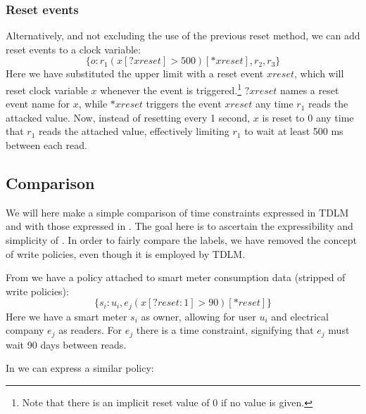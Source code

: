 \subsubsection{Reset events}
Alternatively, and not excluding the use of the previous reset method, we can add reset events to a clock variable:
  \[ \{ o : r_1(x[?xreset] > 500)[*xreset], r_2, r_3 \} \]
Here we have substituted the upper limit with a reset event $xreset$, which will reset clock variable $x$ whenever the event is triggered.\footnote{Note that there is an implicit reset value of 0 if no value is given.}
$?xreset$ names a reset event name for $x$, while $*xreset$ triggers the event $xreset$ any time $r_1$ reads the attacked value.
Now, instead of resetting every 1 second, $x$ is reset to 0 any time that $r_1$ reads the attached value, effectively limiting $r_1$ to wait at least 500 ms between each read.

\subsection{Comparison}
We will here make a simple comparison of time constraints expressed in TDLM and with those expressed in \thelang.
The goal here is to ascertain the expressibility and simplicity of \thelang.
In order to fairly compare the labels, we have removed the concept of write policies, even though it is employed by TDLM.

From \cite{pedersen2015} we have a policy attached to smart meter consumption data (stripped of write policies):
\[ \{s_i : u_i, e_j (x[?reset : 1] > 90)[*reset] \} \]
Here we have a smart meter $s_i$ as owner, allowing for user $u_i$ and electrical company $e_j$ as readers.
For $e_j$ there is a time constraint, signifying that $e_j$ must wait 90 days between reads.

In \thelang{} we can express a similar policy:
\begin{center}
\end{center}

